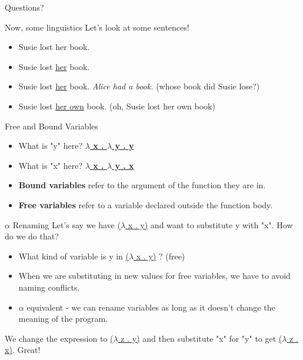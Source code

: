 \documentclass[aspectratio=169]{beamer}
\begin{document}
\begin{frame}{}
    \begin{center}
        {\color{sigma@mainblue} \LARGE Questions?}
    \end{center}
\end{frame}

\begin{frame}{Now, some linguistics}
    Let's look at some sentences! \\
    \begin{itemize}
    \item Susie lost her book. \pause
    \item Susie lost \underline{her} book. \pause
    \item Susie lost \underline{her} book. \textit{Alice had a book.} (whose book did Susie lose?) \pause
    \item Susie lost \underline{her own} book. (oh, Susie lost her own book)
    \end{itemize}
\end{frame}

\begin{frame}{Free and Bound Variables}
    \begin{itemize}
    \item What is "y" here? \underline{\textbf{$\lambda$ x . $\lambda$ y . y}}
    \item What is "x" here? \underline{\textbf{$\lambda$ x . $\lambda$ y . x}} \pause
    \item \textbf{Bound variables} refer to the argument of the function they are in.
    \item \textbf{Free variables} refer to a variable declared outside the function body.
    \end{itemize}
\end{frame}

\begin{frame}{$\alpha$ Renaming}
Let's say we have \underline{($\lambda$ x . y)} and want to substitute y with "x". How do we do that? \pause \\

\begin{itemize}
\item What kind of variable is y in \underline{($\lambda$ x . y)} ? \pause (free)
\item When we are substituting in new values for free variables, we have to avoid naming conflicts.
\item $\alpha$ equivalent - we can rename variables as long as it doesn't change the meaning of the program. 
\end{itemize}

We change the expression to \underline{($\lambda$ z . y)} and then substitute "x" for "y" to get \underline{($\lambda$ z . x)}. Great!
\end{frame}
\end{document}
